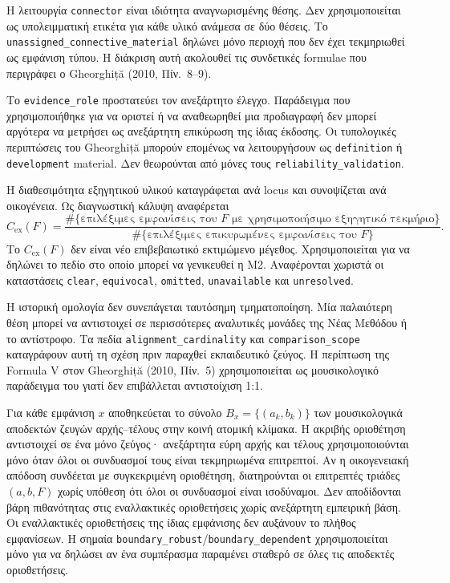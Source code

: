 \documentclass[11pt,a4paper]{article}
\begin{document}
Η λειτουργία \texttt{connector} είναι ιδιότητα αναγνωρισμένης θέσης. Δεν χρησιμοποιείται ως υπολειμματική ετικέτα για κάθε υλικό ανάμεσα σε δύο θέσεις. Το \texttt{unassigned\_connective\_material} δηλώνει μόνο περιοχή που δεν έχει τεκμηριωθεί ως εμφάνιση τύπου. Η διάκριση αυτή ακολουθεί τις συνδετικές formulae που περιγράφει ο Gheorghiță (2010, Πίν.~8--9).

Το \texttt{evidence\_role} προστατεύει τον ανεξάρτητο έλεγχο. Παράδειγμα που χρησιμοποιήθηκε για να οριστεί ή να αναθεωρηθεί μια προδιαγραφή δεν μπορεί αργότερα να μετρήσει ως ανεξάρτητη επικύρωση της ίδιας έκδοσης. Οι τυπολογικές περιπτώσεις του Gheorghiță μπορούν επομένως να λειτουργήσουν ως \texttt{definition} ή \texttt{development} material. Δεν θεωρούνται από μόνες τους \texttt{reliability\_validation}.

Η διαθεσιμότητα εξηγητικού υλικού καταγράφεται ανά locus και συνοψίζεται ανά οικογένεια. Ως διαγνωστική κάλυψη αναφέρεται
\[
C_{\mathrm{ex}}(F)=\frac{\#\{\text{επιλέξιμες εμφανίσεις του }F\text{ με χρησιμοποιήσιμο εξηγητικό τεκμήριο}\}}{\#\{\text{επιλέξιμες επικυρωμένες εμφανίσεις του }F\}}.
\]
Το $C_{\mathrm{ex}}(F)$ δεν είναι νέο επιβεβαιωτικό εκτιμώμενο μέγεθος. Χρησιμοποιείται για να δηλώνει το πεδίο στο οποίο μπορεί να γενικευθεί η M2. Αναφέρονται χωριστά οι καταστάσεις \texttt{clear}, \texttt{equivocal}, \texttt{omitted}, \texttt{unavailable} και \texttt{unresolved}.

Η ιστορική ομολογία δεν συνεπάγεται ταυτόσημη τμηματοποίηση. Μία παλαιότερη θέση μπορεί να αντιστοιχεί σε περισσότερες αναλυτικές μονάδες της Νέας Μεθόδου ή το αντίστροφο. Τα πεδία \texttt{alignment\_cardinality} και \texttt{comparison\_scope} καταγράφουν αυτή τη σχέση πριν παραχθεί εκπαιδευτικό ζεύγος. Η περίπτωση της Formula V στον Gheorghiță (2010, Πίν.~5) χρησιμοποιείται ως μουσικολογικό παράδειγμα του γιατί δεν επιβάλλεται αντιστοίχιση 1:1.

Για κάθε εμφάνιση $x$ αποθηκεύεται το σύνολο $B_x=\{(a_k,b_k)\}$ των μουσικολογικά αποδεκτών ζευγών αρχής--τέλους στην κοινή ατομική κλίμακα. Η ακριβής οριοθέτηση αντιστοιχεί σε ένα μόνο ζεύγος· ανεξάρτητα εύρη αρχής και τέλους χρησιμοποιούνται μόνο όταν όλοι οι συνδυασμοί τους είναι τεκμηριωμένα επιτρεπτοί. Αν η οικογενειακή απόδοση συνδέεται με συγκεκριμένη οριοθέτηση, διατηρούνται οι επιτρεπτές τριάδες $(a,b,F)$ χωρίς υπόθεση ότι όλοι οι συνδυασμοί είναι ισοδύναμοι. Δεν αποδίδονται βάρη πιθανότητας στις εναλλακτικές οριοθετήσεις χωρίς ανεξάρτητη εμπειρική βάση. Οι εναλλακτικές οριοθετήσεις της ίδιας εμφάνισης δεν αυξάνουν το πλήθος εμφανίσεων. Η σημαία \texttt{boundary\_robust}/\texttt{boundary\_dependent} χρησιμοποιείται μόνο για να δηλώσει αν ένα συμπέρασμα παραμένει σταθερό σε όλες τις αποδεκτές οριοθετήσεις.
\end{document}
